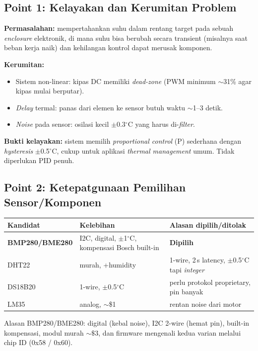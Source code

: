\documentclass[11pt,a4paper]{article}
\begin{document}
\subsection{Point 1: Kelayakan dan Kerumitan Problem}

\textbf{Permasalahan:} mempertahankan suhu dalam rentang target pada sebuah \emph{enclosure} elektronik, di mana suhu bisa berubah secara transient (misalnya saat beban kerja naik) dan kehilangan kontrol dapat merusak komponen.

\textbf{Kerumitan:}
\begin{itemize}
    \item Sistem non-linear: kipas DC memiliki \emph{dead-zone} (PWM minimum $\sim$31\% agar kipas mulai berputar).
    \item \emph{Delay} termal: panas dari elemen ke sensor butuh waktu $\sim$1--3 detik.
    \item \emph{Noise} pada sensor: osilasi kecil $\pm$0.3$^{\circ}$C yang harus di-\emph{filter}.
\end{itemize}

\textbf{Bukti kelayakan:} sistem memilih \emph{proportional control} (P) sederhana dengan \emph{hysteresis} $\pm$0.5$^{\circ}$C, cukup untuk aplikasi \emph{thermal management} umum. Tidak diperlukan PID penuh.

\subsection{Point 2: Ketepatgunaan Pemilihan Sensor/Komponen}

\begin{center}
\begin{tabular}{lll}
\toprule
\textbf{Kandidat} & \textbf{Kelebihan} & \textbf{Alasan dipilih/ditolak} \\
\midrule
\textbf{BMP280/BME280} & I2C, digital, $\pm$1$^{\circ}$C, kompensasi Bosch built-in & \textbf{Dipilih} \\
DHT22          & murah, +humidity & 1-wire, 2\,s latency, $\pm$0.5$^{\circ}$C tapi \emph{integer} \\
DS18B20        & 1-wire, $\pm$0.5$^{\circ}$C & perlu protokol proprietary, pin banyak \\
LM35           & analog, $\sim$\$1 & rentan noise dari motor \\
\bottomrule
\end{tabular}
\end{center}

Alasan BMP280/BME280: digital (kebal noise), I2C 2-wire (hemat pin), built-in kompensasi, modul murah $\sim\$3$, dan firmware mengenali kedua varian melalui chip ID (0x58 / 0x60).
\end{document}
